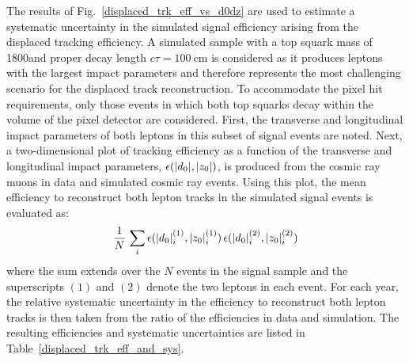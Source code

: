The results of Fig.~\ref{displaced_trk_eff_vs_d0dz} are used to estimate a systematic uncertainty in the simulated signal efficiency arising from the displaced tracking efficiency. A simulated \stoptolb sample with a top squark mass of 1800\GeV and proper decay length $c\tau = \SI{100}{\cm}$ is considered as it produces leptons with the largest impact parameters and therefore represents the most challenging scenario for the displaced track reconstruction. To accommodate the pixel hit requirements, only those events in which both top squarks decay within the volume of the pixel detector are considered. First, the transverse and longitudinal impact parameters of both leptons in this subset of signal events are noted. Next, a two-dimensional plot of tracking efficiency as a function of the transverse and longitudinal impact parameters, $\epsilon(\lvert d_0 \rvert, \lvert z_0 \rvert)$, is produced from the cosmic ray muons in data and simulated cosmic ray events. Using this plot, the mean efficiency to reconstruct both lepton tracks in the simulated signal events is evaluated as:
\begin{equation}
    \frac{1}{N}\,\sum_i\epsilon(\lvert d_0 \rvert^{(1)}_i, \lvert z_0 \rvert^{(1)}_i)\, \epsilon(\lvert d_0 \rvert^{(2)}_i, \lvert z_0 \rvert^{(2)}_i)
\end{equation}
where the sum extends over the $N$ events in the signal sample and the superscripts
$(1)$ and $(2)$ denote the two leptons in each event. For each year, the relative systematic uncertainty in the efficiency to reconstruct both lepton tracks is then taken from the ratio of the efficiencies in data and simulation. The resulting efficiencies and systematic uncertainties are listed in Table~\ref{displaced_trk_eff_and_sys}.

